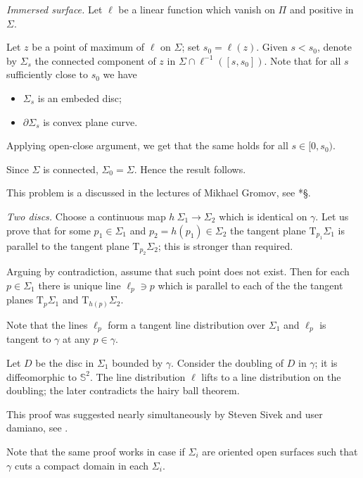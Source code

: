 \textit{Immersed surface.}
Let $\ell$ be a linear function which vanish on $\Pi$ and positive in $\Sigma$.

Let $z$ be a point of maximum of $\ell$ on $\Sigma$;
set $s_0=\ell(z)$.
Given $s<s_0$, denote by $\Sigma_s$ the connected component of $z$ in $\Sigma\cap\ell^{-1}([s,s_0])$.
Note that for all $s$ sufficiently close to $s_0$
we have
\begin{itemize}
\item $\Sigma_s$ is an embeded disc;
\item $\partial\Sigma_s$ is convex plane curve.
\end{itemize}

Applying open-close argument, we get that the same holds for all $s\in[0,s_0)$.

Since $\Sigma$ is connected, $\Sigma_0=\Sigma$.
Hence the result follows.

This problem is a discussed in the lectures of Mikhael Gromov, 
see \cite{gromov-SGMC}*{\S\textonehalf}.



\textit{Two discs.}
Choose a continuous map $h\:\Sigma_1\to \Sigma_2$
which is identical on $\gamma$.
Let us prove that for some $p_1\in \Sigma_1$ and $p_2=h(p_1)\in \Sigma_2$
the tangent plane $\mathrm{T}_{p_1} \Sigma_1$ is parallel to the tangent plane $\mathrm{T}_{p_2} \Sigma_2$;
this is stronger than required.

Arguing by contradiction,
assume that such point does not exist.
Then for each $p\in\Sigma_1$
there is unique line $\ell_p\ni p$ 
which is parallel to each of the the tangent planes $\mathrm{T}_{p} \Sigma_1$ and $\mathrm{T}_{h(p)} \Sigma_2$.

Note that the lines $\ell_p$ form a tangent line distribution over $\Sigma_1$
and $\ell_p$ is tangent to $\gamma$ at any $p\in\gamma$.

Let $D$ be the disc in $\Sigma_1$ bounded by $\gamma$.
Consider the doubling of $D$ in $\gamma$;
it is diffeomorphic to $\mathbb S^2$.
The line distribution $\ell$ lifts to a line distribution on the doubling;
the later contradicts the hairy ball theorem.

 This proof was suggested nearly simultaneously by Steven Sivek and user damiano, see \cite{two-discs}.

Note that the same proof works in case if $\Sigma_i$ are oriented open surfaces such that $\gamma$ cuts a compact domain in each $\Sigma_i$.

